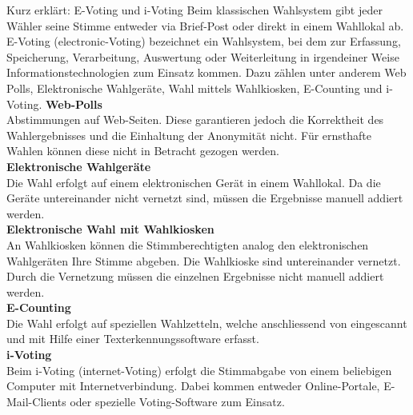 \documentclass[10pt,a4paper]{article} %
\begin{document}
\begin{center}
\vspace{10pt}
\begin{shortExplainedBox}{Kurz erklärt: E-Voting und i-Voting}
Beim klassischen Wahlsystem gibt jeder Wähler seine Stimme entweder via Brief-Post oder direkt in einem Wahllokal ab. E-Voting (electronic-Voting) bezeichnet ein Wahlsystem, bei dem zur Erfassung, Speicherung, Verarbeitung, Auswertung oder Weiterleitung in irgendeiner Weise Informationstechnologien zum Einsatz kommen. Dazu zählen unter anderem Web Polls, Elektronische Wahlgeräte, Wahl mittels Wahlkiosken, E-Counting und i-Voting.
\newline\newline
\textbf{Web-Polls}\\
Abstimmungen auf Web-Seiten. Diese garantieren jedoch die Korrektheit des Wahlergebnisses und die Einhaltung der Anonymität nicht. Für ernsthafte Wahlen können diese nicht in Betracht gezogen werden.\\

\textbf{Elektronische Wahlgeräte}\\
Die Wahl erfolgt auf einem elektronischen Gerät in einem Wahllokal. Da die Geräte untereinander nicht vernetzt sind, müssen die Ergebnisse manuell addiert werden.\\

\textbf{Elektronische Wahl mit Wahlkiosken}\\
An Wahlkiosken können die Stimmberechtigten analog den elektronischen Wahlgeräten Ihre Stimme abgeben. Die Wahlkioske sind untereinander vernetzt. Durch die Vernetzung müssen die einzelnen Ergebnisse nicht manuell addiert werden.\\

\textbf{E-Counting}\\
Die Wahl erfolgt auf speziellen Wahlzetteln, welche anschliessend von eingescannt und mit Hilfe einer Texterkennungssoftware erfasst.\\

\textbf{i-Voting}\\
Beim i-Voting (internet-Voting) erfolgt die Stimmabgabe von einem beliebigen Computer mit Internetverbindung. Dabei kommen entweder Online-Portale, E-Mail-Clients oder spezielle Voting-Software zum Einsatz.\\
\end{shortExplainedBox}
\vspace{10pt}
\end{center}
\end{document}
